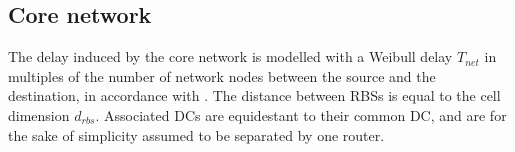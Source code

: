\subsection{Core network}
The delay induced by the core network is modelled with a Weibull delay $T_{net}$ in multiples of the number of network nodes between the source and the destination, in accordance with \cite{papagiannaki2003measurement}. The distance between \ac{RBS}s is equal to the cell dimension $d_{rbs}$. Associated \ac{DC}s are equidestant to their common \ac{DC}, and are for the sake of simplicity assumed to be separated by one router.